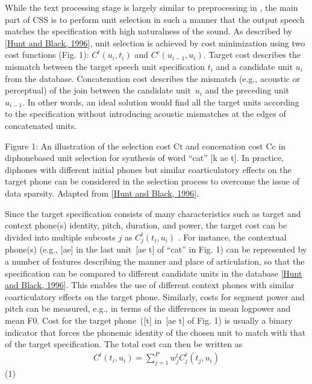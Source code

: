 \documentclass[letterpaper,10pt,english]{jupyterBook}
\begin{document}
\sphinxAtStartPar
While the text processing stage is largely similar to pre\sphinxhyphen{}processing in
{\hyperref[\detokenize{Synthesis/Statistical_parametric_speech_synthesis::doc}]{}}, the main part of CSS
is to perform unit selection in such a manner that the output speech
matches the specification with high naturalness of the sound. As
described by {[}\hyperlink{cite.Synthesis/Concatenative_speech_synthesis:id54}{Hunt and Black, 1996}{]}, unit selection is achieved by cost
minimization using two cost functions (Fig. 1): 
\(C^{t}(u_{i},t_{i})\) and 
\(C^{c}(u_{i-1},u_{i})\). Target cost
describes the mismatch between the target speech unit specification
\(t_{i}\) and a candidate unit \(u_{i}\) from the database.
Concatenation cost describes the mismatch (e.g., acoustic or perceptual)
of the join between the candidate unit \(u_{i}\) and the preceding
unit \(u_{i-1}\). In other words, an ideal solution
would find all the target units according to the specification without
introducing acoustic mismatches at the edges of concatenated units.

\sphinxAtStartPar
{}
Figure 1: An illustration of the selection cost Ct and concenation cost Cc in diphone\sphinxhyphen{}based unit selection for synthesis of word “cat” {[}k ae t{]}. In practice, diphones with different initial phones but similar coarticulatory effects on the target phone can be considered in the selection process to overcome the issue of data sparsity. Adapted from {[}\hyperlink{cite.Synthesis/Concatenative_speech_synthesis:id54}{Hunt and Black, 1996}{]}.

\sphinxAtStartPar
Since the target specification consists of many characteristics such as
target and context phone(s) identity, pitch, duration, and power, the
target cost can be divided into multiple subcosts \(j\) as
\( C_{j}^{t}(t_{i},u_{i}) \) . For instance, the contextual
phone(s) (e.g., {[}ae{]} in the last unit {[}ae t{]} of “cat” in Fig. 1) can
be represented by a number of features describing the manner and place
of articulation, so that the specification can be compared to different
candidate units in the database {[}\hyperlink{cite.Synthesis/Concatenative_speech_synthesis:id54}{Hunt and Black, 1996}{]}. This enables the
use of different context phones with similar coarticulatory effects on
the target phone. Similarly, costs for segment power and pitch can be
measured, e.g., in terms of the differences in mean log\sphinxhyphen{}power and mean
F0. Cost for the target phone ({[}t{]} in {[}ae t{]} of Fig. 1) is usually a
binary indicator that forces the phonemic identity of the chosen unit to
match with that of the target specification. The total cost can then be
written as
\begin{equation*}
\begin{split}
C^{t}(t_i,u_i)=\sum_{j=1}^{P}w_{j}^{t}C_{j}^{t}(t_{j},u_{i}) \end{split}
\end{equation*}
\sphinxAtStartPar
(1)
\end{document}
